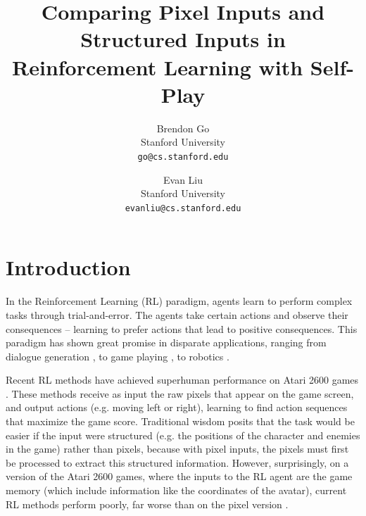 \documentclass[10pt,twocolumn,letterpaper]{article}
\begin{document}
\title{Comparing Pixel Inputs and Structured Inputs in Reinforcement Learning with Self-Play}

\author{Brendon Go\\
Stanford University\\
{\tt\small go@cs.stanford.edu}
\and
Evan Liu\\
Stanford University\\
{\tt\small evanliu@cs.stanford.edu}
}

\maketitle

\section{Introduction}

In the Reinforcement Learning (RL) paradigm, agents learn to perform complex
tasks through trial-and-error. The agents take certain actions and observe their
consequences -- learning to prefer actions that lead to positive consequences.
This paradigm has shown great promise in disparate applications, ranging from
dialogue generation \citep{dialogue2016}, to game playing \citep{mnih2015human},
to robotics \citep{robotics2016}.

Recent RL methods have achieved superhuman performance on Atari 2600 games
\citep{bellemare2013arcade}. These methods receive as input the raw pixels that
appear on the game screen, and output actions (e.g. moving left or right),
learning to find action sequences that maximize the game score. Traditional
wisdom posits that the task would be easier if the input were structured (e.g.
the positions of the character and enemies in the game) rather than pixels,
because with pixel inputs, the pixels must first be processed to extract this
structured information. However, surprisingly, on a version of the Atari 2600
games, where the inputs to the RL agent are the game memory (which include
information like the coordinates of the avatar), current RL methods perform
poorly, far worse than on the pixel version \citep{atariRAM}.
\end{document}
